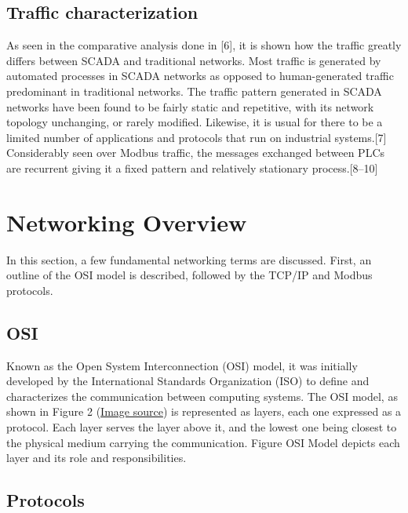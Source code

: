 \documentclass[11pt,]{article}
\begin{document}
\subsection{Traffic characterization}\label{traffic-characterization}

As seen in the comparative analysis done in {[}6{]}, it is shown how the
traffic greatly differs between SCADA and traditional networks. Most
traffic is generated by automated processes in SCADA networks as opposed
to human-generated traffic predominant in traditional networks. The
traffic pattern generated in SCADA networks have been found to be fairly
static and repetitive, with its network topology unchanging, or rarely
modified. Likewise, it is usual for there to be a limited number of
applications and protocols that run on industrial systems.{[}7{]}
Considerably seen over Modbus traffic, the messages exchanged between
PLCs are recurrent giving it a fixed pattern and relatively stationary
process.{[}8--10{]}

\clearpage

\section{Networking Overview}\label{networking-overview}

In this section, a few fundamental networking terms are discussed.
First, an outline of the OSI model is described, followed by the TCP/IP
and Modbus protocols.

\subsection{OSI}\label{osi}

Known as the Open System Interconnection (OSI) model, it was initially
developed by the International Standards Organization (ISO) to define
and characterizes the communication between computing systems. The OSI
model, as shown in Figure 2
(\href{https://engineering.linkedin.com/endorsements/geographic-trends-skills-using-linkedins-endorsement-feature}{Image
source}) is represented as layers, each one expressed as a protocol.
Each layer serves the layer above it, and the lowest one being closest
to the physical medium carrying the communication. Figure OSI Model
depicts each layer and its role and responsibilities.

\subsection{Protocols}\label{protocols}
\end{document}
